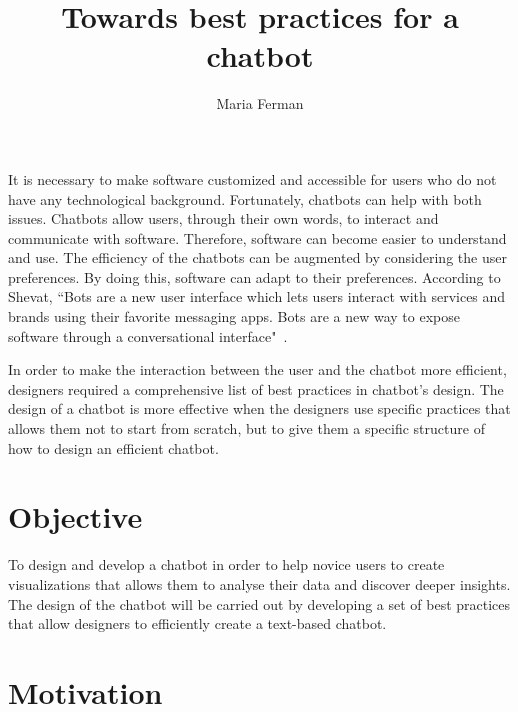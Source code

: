 \documentclass[a4paper,10pt]{article}
\title{Towards best practices for a chatbot}
\author{Maria Ferman}
\begin{document}
\maketitle
It is necessary to make software customized and accessible for users who do not have any technological background. Fortunately, chatbots can help with both issues. Chatbots allow users, through their own words, to interact and communicate with software. Therefore, software can become easier to understand and use. The efficiency of the chatbots can be augmented by considering the user preferences. By doing this, software can adapt to their preferences. According to Shevat,  ``Bots are a new user interface which lets users interact with services and brands using their favorite messaging apps. Bots are a new way to expose software through a conversational interface"~\cite{Shevat2017}. 

In order to make the interaction between the user and the chatbot more efficient, designers required a comprehensive list of best practices in chatbot's design. 
The design of a chatbot is more effective when the designers use specific practices that allows them not to start from scratch, but to give them a specific structure of how to design an efficient chatbot. 

\section*{Objective}


To design and develop a chatbot in order to help novice users to create visualizations that allows them to analyse their data and discover deeper insights. The design of the chatbot will be carried out by developing a set of best practices that allow designers to efficiently create a text-based chatbot.  

\section*{Motivation}

\end{document}

